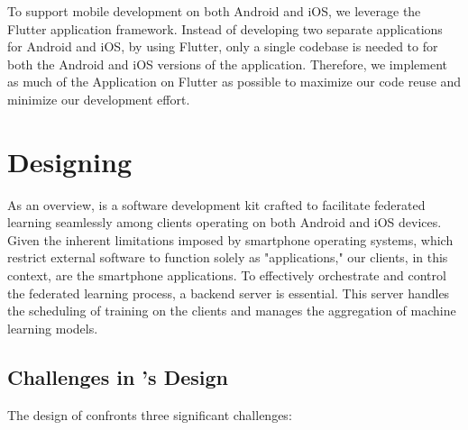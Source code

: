 To support mobile development on both Android and iOS,
we leverage the Flutter application framework.
Instead of developing two separate applications for Android and iOS,
by using Flutter,
only a single codebase is needed to for both the Android and iOS versions of
the application.
Therefore, we implement as much of the \fedcampus Application on Flutter as
possible to maximize our code reuse and minimize our development effort.

\section{Designing \fedkit}

As an overview,
\fedkit is a software development kit crafted to facilitate federated learning
seamlessly among clients operating on both Android and iOS devices.
Given the inherent limitations imposed by smartphone operating systems,
which restrict external software to function solely as "applications," our
clients, in this context, are the smartphone applications.
To effectively orchestrate and control the federated learning process,
a backend server is essential.
This server handles the scheduling of training on the clients and manages the
aggregation of machine learning models.

\subsection{Challenges in \fedkit's Design}

The design of \fedkit confronts three significant challenges:

